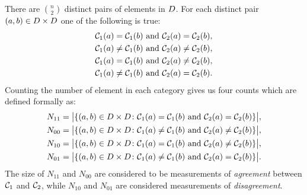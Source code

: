 There are $\binom{n}{2}$ distinct pairs of elements in $D$.  For each
distinct pair $(a,b) \in D \times D$ one of the following is true:
\begin{align*}
\mathcal{C}_1(a)=\mathcal{C}_1(b) &\text{ and } \mathcal{C}_2(a)=\mathcal{C}_2(b),\\
\mathcal{C}_1(a)\neq \mathcal{C}_1(b) &\text{ and } \mathcal{C}_2(a)\neq \mathcal{C}_2(b),\\
\mathcal{C}_1(a)=\mathcal{C}_1(b) &\text{ and } \mathcal{C}_2(a)\neq \mathcal{C}_2(b),\\
\mathcal{C}_1(a)\neq \mathcal{C}_1(b) &\text{ and } \mathcal{C}_2(a)=\mathcal{C}_2(b).
\end{align*}
Counting the number of element in each category gives us four counts which are
defined formally as:
\begin{align*}
  N_{11} &= \big|\{(a,b) \in D \times D \colon
              \mathcal{C}_1(a)=\mathcal{C}_1(b) \text{ and } \mathcal{C}_2(a)=\mathcal{C}_2(b)
            \}\big|, \\
  N_{00} &= \big|\{(a,b) \in D \times D \colon
              \mathcal{C}_1(a)\neq\mathcal{C}_1(b) \text{ and } \mathcal{C}_2(a)\neq\mathcal{C}_2(b)
            \}\big|, \\
  N_{10} &= \big|\{(a,b) \in D \times D \colon
              \mathcal{C}_1(a)=\mathcal{C}_1(b) \text{ and } \mathcal{C}_2(a)\neq\mathcal{C}_2(b)
            \}\big|, \\
  N_{01} &= \big|\{(a,b) \in D \times D \colon
              \mathcal{C}_1(a)\neq\mathcal{C}_1(b) \text{ and } \mathcal{C}_2(a)=\mathcal{C}_2(b)
            \}\big|.
\end{align*}
The size of $N_{11}$ and $N_{00}$ are considered to be measurements of
\textit{agreement} between $\mathcal{C}_1$ and $\mathcal{C}_2$, while $N_{10}$ and
$N_{01}$ are considered measurements of \textit{disagreement}.

